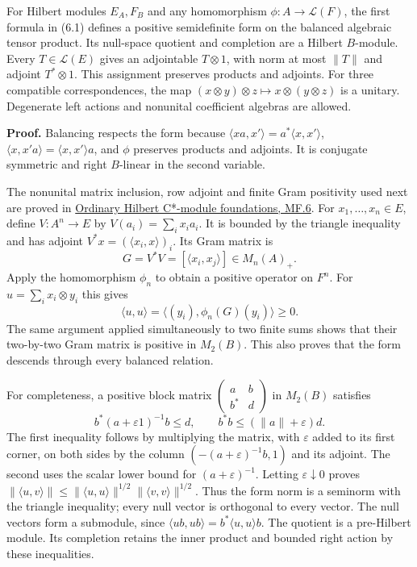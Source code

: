\documentclass[
  11pt,
]{article}
\begin{document}
For Hilbert modules \(E_A,F_B\) and any homomorphism
\(\phi:A\to\mathcal L(F)\), the first formula in (6.1) defines a
positive semidefinite form on the balanced algebraic tensor product. Its
null-space quotient and completion are a Hilbert \(B\)-module. Every
\(T\in\mathcal L(E)\) gives an adjointable \(T\otimes1\), with norm at
most \(\|T\|\) and adjoint \(T^*\otimes1\). This assignment preserves
products and adjoints. For three compatible correspondences, the map
\((x\otimes y)\otimes z\mapsto x\otimes(y\otimes z)\) is a unitary.
Degenerate left actions and nonunital coefficient algebras are allowed.

\textbf{Proof.} Balancing respects the form because
\(\langle xa,x'\rangle=a^*\langle x,x'\rangle\),
\(\langle x,x'a\rangle=\langle x,x'\rangle a\), and \(\phi\) preserves
products and adjoints. It is conjugate symmetric and right \(B\)-linear
in the second variable.

The nonunital matrix inclusion, row adjoint and finite Gram positivity
used next are proved in
\href{supporting/hilbert-c-star-modules-and-morita-equivalence/hilbert-module-foundations.html\#mf-006}{Ordinary
Hilbert C*-module foundations, MF.6}. For \(x_1,\ldots,x_n\in E\),
define \(V:A^n\to E\) by \(V(a_i)=\sum_i x_ia_i\). It is bounded by the
triangle inequality and has adjoint \(V^*x=(\langle x_i,x\rangle)_i\).
Its Gram matrix is \[
G=V^*V=[\langle x_i,x_j\rangle]\in M_n(A)_+.
\] Apply the homomorphism \(\phi_n\) to obtain a positive operator on
\(F^n\). For \(u=\sum_i x_i\otimes y_i\) this gives \[
\langle u,u\rangle
=\langle (y_i),\phi_n(G)(y_i)\rangle\geq0.
\] The same argument applied simultaneously to two finite sums shows
that their two-by-two Gram matrix is positive in \(M_2(B)\). This also
proves that the form descends through every balanced relation.

For completeness, a positive block matrix
\(\begin{pmatrix}a&b\\b^*&d\end{pmatrix}\) in \(M_2(B)\) satisfies \[
b^*(a+\varepsilon1)^{-1}b\leq d,
\qquad b^*b\leq(\|a\|+\varepsilon)d.
\] The first inequality follows by multiplying the matrix, with
\(\varepsilon\) added to its first corner, on both sides by the column
\((-(a+\varepsilon)^{-1}b,1)\) and its adjoint. The second uses the
scalar lower bound for \((a+\varepsilon)^{-1}\). Letting
\(\varepsilon\downarrow0\) proves
\(\|\langle u,v\rangle\|\leq\|\langle u,u\rangle\|^{1/2}\|\langle v,v\rangle\|^{1/2}\).
Thus the form norm is a seminorm with the triangle inequality; every
null vector is orthogonal to every vector. The null vectors form a
submodule, since \(\langle ub,ub\rangle=b^*\langle u,u\rangle b\). The
quotient is a pre-Hilbert module. Its completion retains the inner
product and bounded right action by these inequalities.
\end{document}
